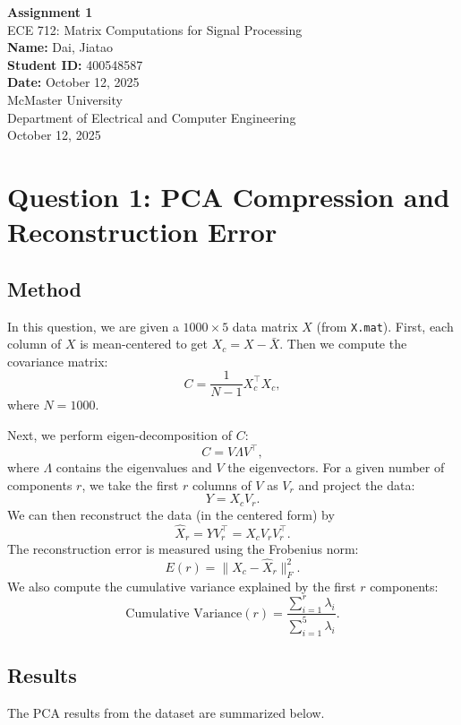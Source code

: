 \documentclass[12pt,a4paper]{article}
\newcommand{\coursename}{ECE 712: Matrix Computations for Signal Processing}
\newcommand{\assignmenttitle}{Assignment 1}
\newcommand{\studentname}{Dai, Jiatao}
\newcommand{\studentid}{400548587}
\newcommand{\duedate}{October 12, 2025}
\begin{document}
\begin{titlepage}
    \centering
    \vspace*{2cm}
    {\Huge \textbf{\assignmenttitle}}\\[1.5cm]
    {\Large \coursename}\\[1cm]
    \vspace{1cm}
    \textbf{Name:} \studentname \\[0.3cm]
    \textbf{Student ID:} \studentid \\[0.3cm]
    \textbf{Date:} \duedate \\[2cm]

    \vfill
    {\Large McMaster University \\[0.3cm]
    Department of Electrical and Computer Engineering \\[0.3cm]
    October 12, 2025}
\end{titlepage}

\tableofcontents
\newpage

\section{Question 1: PCA Compression and Reconstruction Error}

\subsection{Method}
In this question, we are given a $1000 \times 5$ data matrix $X$ (from \texttt{X.mat}). 
First, each column of $X$ is mean-centered to get $X_c = X - \bar{X}$. 
Then we compute the covariance matrix:
\[
C = \frac{1}{N-1} X_c^\top X_c,
\]
where $N = 1000$. 

Next, we perform eigen-decomposition of $C$:
\[
C = V \Lambda V^\top,
\]
where $\Lambda$ contains the eigenvalues and $V$ the eigenvectors. 
For a given number of components $r$, we take the first $r$ columns of $V$ as $V_r$ and project the data:
\[
Y = X_c V_r.
\]
We can then reconstruct the data (in the centered form) by
\[
\hat{X}_r = Y V_r^\top = X_c V_r V_r^\top.
\]
The reconstruction error is measured using the Frobenius norm:
\[
E(r) = \|X_c - \hat{X}_r\|_F^2.
\]
We also compute the cumulative variance explained by the first $r$ components:
\[
\text{Cumulative Variance}(r) = \frac{\sum_{i=1}^r \lambda_i}{\sum_{i=1}^5 \lambda_i}.
\]

\subsection{Results}
The PCA results from the dataset are summarized below.
\end{document}
